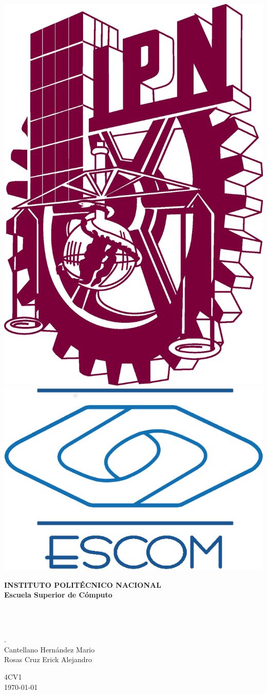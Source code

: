 \thispagestyle{empty}
\begin{center}  
  \includegraphics[height=1.20 in]{./image/title-page/IPN.png}
  \hspace{3.85 in}
	\includegraphics[height=1.20 in]{./image/title-page/ESCOM.png}
	\vspace{0.05 in}
	
	\begin{LARGE} \bf
		INSTITUTO POLIT\'ECNICO NACIONAL\\[6 pt]
		Escuela Superior de Cómputo\\[30 pt]
	\end{LARGE}
	\vfill
	\begin{Large} \em
		\nameSubject\\[6 pt]
		\nameProfessor\\[30 pt]
	\end{Large}
  \vfill	
	\begin{large}
		\nameDoc.\\[30 pt]
		Cantellano Hern\'andez Mario\\[6 pt]
		Rosas Cruz Erick Alejandro\\[30 pt]
	\end{large}
	4CV1\\[12 pt]
	\vfill
	\ddmmyydate\today
\end{center}
